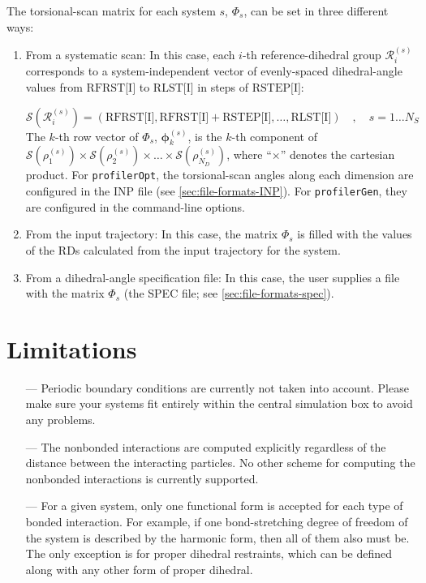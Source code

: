 \documentclass[10pt,a4paper,openany]{memoir}
\numberwithin{equation}{section}
\newcommand{\profileropt}[0]{\texttt{profilerOpt}}
\newcommand{\profilergen}[0]{\texttt{profilerGen}}
\begin{document}
The torsional-scan matrix for each system $s$, $\Phi_s$, can
be set in three different ways:
\begin{enumerate}
\item From a systematic scan: In this case, each $i$-th reference-dihedral group
  $\mathcal{R}_i^{(s)}$ corresponds to a system-independent vector of
  evenly-spaced dihedral-angle values from $\text{RFRST[I]}$ to $\text{RLST[I]}$
  in steps of $\text{RSTEP[I]}$:
  
  $$\mathcal{S}(\mathcal{R}_i^{(s)})  = (\text{RFRST[I]}, \text{RFRST[I]} + \text{RSTEP[I]}, \ldots , \text{RLST[I]}) \quad , \quad s=1 \ldots N_S $$
  The $k$-th row vector of $\Phi_s$, $\boldsymbol{\phi}_k^{(s)}$, is the $k$-th
  component of
  $\mathcal{S}({\rho_1^{(s)}}) \times \mathcal{S}({\rho_2^{(s)}}) \times \ldots
  \times \mathcal{S}(\rho_{N_D}^{(s)})$, where ``$\times$'' denotes the
  cartesian product.  For \profileropt{}, the torsional-scan angles along each
  dimension are configured in the INP file (see \autoref{sec:file-formats-INP}).
  For \profilergen{}, they are configured in the command-line options.


\item From the input trajectory: In this case, the matrix $\Phi_s$ is
  filled with the values of the RDs calculated from the input
  trajectory for the system.
\item From a dihedral-angle specification file: In this case, the user
  supplies a file with the matrix $\Phi_s$ (the SPEC file; see
  \autoref{sec:file-formats-spec}).
\end{enumerate}


\section{Limitations}
\label{sec:limitations}

\begin{itemize}
\item[---] Periodic boundary conditions are currently not taken into
  account. Please make sure your systems fit entirely within the
  central simulation box to avoid any problems.
\item[---] The nonbonded interactions are computed explicitly
  regardless of the distance between the interacting particles. No
  other scheme for computing the nonbonded interactions is currently
  supported.
\item[---] For a given system, only one functional form is accepted
  for each type of bonded interaction. For example, if one
  bond-stretching degree of freedom of the system is described by the
  harmonic form, then all of them also must be. The only exception is
  for proper dihedral restraints, which can be defined along with any
  other form of proper dihedral.
\end{itemize}
\end{document}
